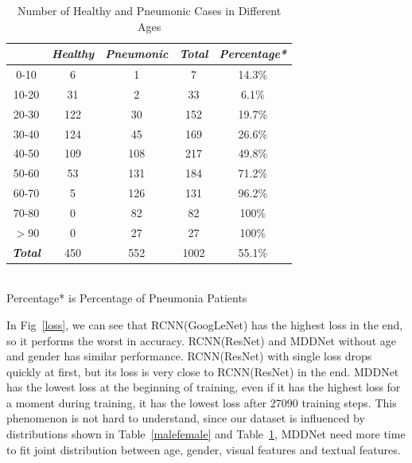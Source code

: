 \documentclass[journal]{IEEEtran}
\begin{document}
\begin{table}[htb]
    \vspace{-0cm}
    \caption{Number of Healthy and Pneumonic Cases in Different Ages}
    \vspace{-0cm}
    \begin{center}
    \begin{tabular}{|c|c|c|c|c|}
        \hline
        \textbf{\textit{}} & \textbf{\textit{Healthy}} & \textbf{\textit{Pneumonic}}& \textbf{\textit{Total}}& \textbf{\textit{Percentage*}} \\
    \hline
    0-10 & 6 & 1 & 7 & 14.3\%\\
    10-20 & 31 & 2 & 33 & 6.1\%\\
    20-30 & 122 & 30 & 152 & 19.7\%\\
    30-40 & 124 & 45 & 169 &26.6\%\\
    40-50 & 109 & 108 & 217 &49.8\%\\
    50-60 & 53 & 131 & 184 &71.2\%\\
    60-70 & 5 & 126 & 131 &96.2\%\\
    70-80 & 0 & 82 & 82 &100\%\\
    $>90$& 0 & 27 & 27 &100\%\\
    \hline 
    \textbf{\textit{Total}} & 450 & 552 & 1002 & 55.1\% \\
    
    \hline
    \end{tabular}
    \vspace{0.1cm}
    \label{differentages}\\
    \footnotesize{Percentage* is Percentage of Pneumonia Patients}

    \end{center}
    \vspace{-0.0cm}
    \end{table}


In Fig~\ref{loss}, we can see that RCNN(GoogLeNet) has the highest loss in the end, so it performs the worst in accuracy. RCNN(ResNet) and MDDNet without age and gender has similar performance. RCNN(ResNet) with single loss drops quickly at first, but its loss is very close to RCNN(ResNet) in the end. MDDNet has the lowest loss at the beginning of training, even if it has the highest loss for a moment during training, it has the lowest loss after 27090 training steps. This phenomenon is not hard to understand, since our dataset is influenced by distributions shown in Table~\ref{malefemale} and Table~\ref{differentages}, MDDNet need more time to fit joint distribution between age, gender, visual features and textual features.
\end{document}
